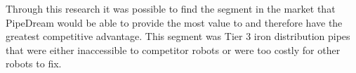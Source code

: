 \documentclass[11pt]{article}		%
\newcommand{\supercite}[1]{\textsuperscript{\cite{#1}}}		%
\begin{document}
            \hspace*{2ex}Through this research it was possible to find the segment in the market that PipeDream would be able to provide the most value to and therefore have the greatest competitive advantage. This segment was Tier 3 iron distribution pipes that were either inaccessible to competitor robots or were too costly for other robots to fix.


    		        
    
\end{document}
